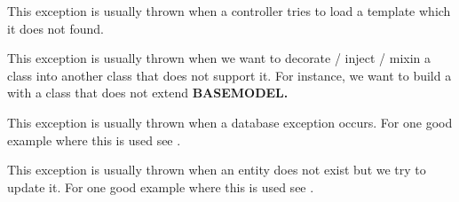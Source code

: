 \documentclass[letterpaper,10pt,english]{sphinxmanual}
\begin{document}

\begin{fulllineitems}
\label{features/exceptions:fantastico.exceptions.FantasticoTemplateNotFoundError}
This exception is usually thrown when a controller tries to load a template which it does not found.

\end{fulllineitems}


\begin{fulllineitems}
\label{features/exceptions:fantastico.exceptions.FantasticoIncompatibleClassError}
This exception is usually thrown when we want to decorate / inject / mixin a class into another class
that does not support it. For instance, we want to build a {\hyperref[features/mvc:fantastico.mvc.model_facade.ModelFacade]{}}
with a class that does not extend \textbf{BASEMODEL.}

\end{fulllineitems}


\begin{fulllineitems}
\label{features/exceptions:fantastico.exceptions.FantasticoDbError}
This exception is usually thrown when a database exception occurs. For one good example where this is used see
{\hyperref[features/mvc:fantastico.mvc.model_facade.ModelFacade]{}}.

\end{fulllineitems}


\begin{fulllineitems}
\label{features/exceptions:fantastico.exceptions.FantasticoDbNotFoundError}
This exception is usually thrown when an entity does not exist but we try to update it. For one good example where this is 
used see {\hyperref[features/mvc:fantastico.mvc.model_facade.ModelFacade]{}}.

\end{fulllineitems}
\end{document}
